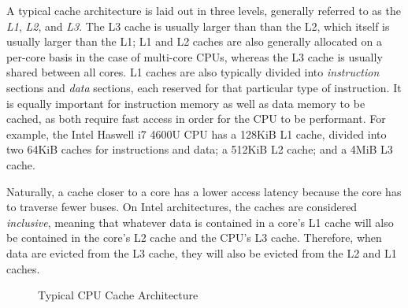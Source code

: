 \documentclass[11pt]{llncs}
\begin{document}
A typical cache architecture is laid out in three levels, generally referred to
as the \textit{L1}, \textit{L2}, and \textit{L3}. The L3 cache is usually larger
than than the L2, which itself is usually larger than the L1; L1 and L2 caches
are also generally allocated on a per-core basis in the case of multi-core CPUs,
whereas the L3 cache is usually shared between all cores.  L1 caches are also
typically divided into \textit{instruction} sections and \textit{data} sections,
each reserved for that particular type of instruction.  It is equally important
for instruction memory as well as data memory to be cached, as both require fast
access in order for the CPU to be performant. For example, the Intel Haswell i7
4600U CPU has a 128KiB L1 cache, divided into two 64KiB caches for instructions
and data; a 512KiB L2 cache; and a 4MiB L3 cache.

Naturally, a cache closer to a core has a lower access latency because the core
has to traverse fewer buses. On Intel architectures, the caches are considered
\textit{inclusive}, meaning that whatever data is contained in a core's L1 cache
will also be contained in the core's L2 cache and the CPU's L3 cache.
Therefore, when data are evicted from the L3 cache, they will also be evicted
from the L2 and L1 caches.

\begin{figure}[h]
    \setlength\fboxsep{0pt}
    \setlength\fboxrule{0.5pt}
    \centering
    \caption{Typical CPU Cache Architecture}
\end{figure}
\end{document}
